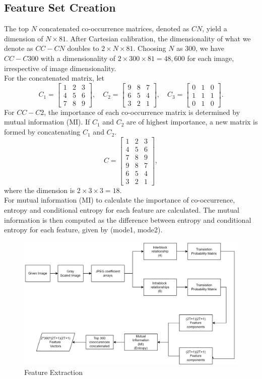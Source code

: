 \subsection{Feature Set Creation}
The top $N$ concatenated co-occurrence matrices, denoted as $CN$, yield a dimension of $N \times 81$. After Cartesian calibration, the dimensionality of what we denote as $CC-CN$ doubles to $2 \times N \times 81$. Choosing $N$ as 300, we have $CC-C300$ with a dimensionality of $2 \times 300 \times 81 = 48,600$ for each image, irrespective of image dimensionality.\\For the concatenated matrix, let
\[
    C_1 = \begin{bmatrix} 1 & 2 & 3 \\ 4 & 5 & 6 \\ 7 & 8 & 9 \end{bmatrix}, \quad
    C_2 = \begin{bmatrix} 9 & 8 & 7 \\ 6 & 5 & 4 \\ 3 & 2 & 1 \end{bmatrix}, \quad
    C_3 = \begin{bmatrix} 0 & 1 & 0 \\ 1 & 1 & 1 \\ 0 & 1 & 0 \end{bmatrix}.
\]
For $CC-C2$, the importance of each co-occurrence matrix is determined by mutual information (MI). If $C_1$ and $C_2$ are of highest importance, a new matrix is formed by concatenating $C_1$ and $C_2$.
\[
    C = \begin{bmatrix} 1 & 2 & 3 \\ 4 & 5 & 6 \\ 7 & 8 & 9 \\ 9 & 8 & 7 \\ 6 & 5 & 4 \\ 3 & 2 & 1 \end{bmatrix},
\]
where the dimension is $2 \times 3 \times 3 = 18$.\\
For mutual information (MI) to calculate the importance of co-occurrence, entropy and conditional entropy for each feature are calculated. The mutual information is then computed as the difference between entropy and conditional entropy for each feature, given by (mode1, mode2).
 \begin{figure}[H]
    \raggedright
        \vspace{2cm}
        \includegraphics[width=160mm]{./img/Fextraction.png}
        \caption{Feature Extraction}
\end{figure}
\clearpage
